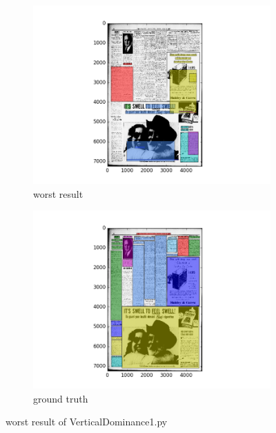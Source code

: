 \documentclass[a4paper,10pt]{article}
\begin{document}
					\begin{figure}
					\centering
					\begin{subfigure}{.5\textwidth}
					  \centering
					  \includegraphics[width=10cm]
					{VerticalDominance1.py.worst.png}
					  \caption{worst result}
					  \label{fig:sub1}
					\end{subfigure}%
					\begin{subfigure}{.5\textwidth}
					  \centering
					  \includegraphics[width=10cm]
					{VerticalDominance1.py.gt.worst.png}
					  \caption{ground truth}
					  \label{fig:sub2}
					\end{subfigure}
					\caption
					{worst result of VerticalDominance1.py}
					\label{fig:test}
					\end{figure}
					
\end{document}
